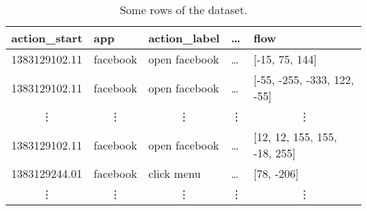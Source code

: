\begin{table}[]
\label{tab:dataset}
\begin{tabular}{@{}lllll@{}}
\toprule
\textbf{action\_start}      & \textbf{app}               & \textbf{action\_label}     & \textbf{\dots}             & \textbf{flow}                \\ \midrule
1383129102.11              & facebook                   & open facebook              & \dots                      & [-15, 75, 144]               \\
1383129102.11              & facebook                   & open facebook              & \dots                      & [-55, -255, -333, 122, -55]  \\
\multicolumn{1}{c}{\vdots} & \multicolumn{1}{c}{\vdots} & \multicolumn{1}{c}{\vdots} & \multicolumn{1}{c}{\vdots} & \multicolumn{1}{c}{\vdots}   \\
1383129102.11              & facebook                   & open facebook              & \dots                      & [12, 12, 155, 155, -18, 255] \\
1383129244.01              & facebook                   & click menu                 & \dots                      & [78, -206]                   \\
\multicolumn{1}{c}{\vdots} & \multicolumn{1}{c}{\vdots} & \multicolumn{1}{c}{\vdots} & \multicolumn{1}{c}{\vdots} & \multicolumn{1}{c}{\vdots}   \\ \bottomrule
\end{tabular}
\caption{\small{Some rows of the dataset.}}
\end{table}

